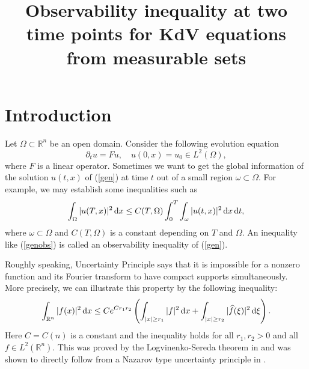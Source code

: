 \documentclass[12pt]{amsart}
\title[Observability inequality ]
{ \bf
 Observability inequality at two time points for KdV equations from measurable sets}
\author[ ]
{    }
\def\R {\mathbb{R}}
\def\d{{\,\rm d}}
\theoremstyle{definition}
\numberwithin{equation}{section}
\begin{document}



\maketitle
\tableofcontents
\section{Introduction}
Let $\Omega \subset \R^{n}$ be an open domain.
Consider the following evolution equation 
\begin{equation}
    \partial_t u=Fu,\quad u(0,x)=u_0\in L^2(\Omega),\label{gen}
\end{equation}
where $F$ is a linear operator.
Sometimes we want to get the global information of the solution $u(t,x)$ of (\ref{gen}) at time $t$ out of a small region $\omega\subset \Omega$. For example, we may establish some inequalities such as 
\begin{equation}
    \int_{\Omega}|u(T,x)|^2\d x\le C(T,\Omega)\int_0^T\int_\omega |u(t,x)|^2\d x\d t,\label{genobs}
\end{equation}  
where $\omega\subset \Omega$ and $C(T,\Omega)$ is a constant depending on $T$ and $\Omega$.
An inequality like (\ref{genobs}) is called an observability inequality of (\ref{gen}).


Roughly speaking, Uncertainty Principle says that it is impossible for a nonzero function and its Fourier transform to have compact supports simultaneously. More precisely, we can illustrate this property by the following inequality:
\begin{equation}
    \int_{\R^n}|f(x)|^2\d x\le Ce^{Cr_1r_2}\left(\int_{|x|\ge r_1}|f|^2\d x+\int_{|x|\ge r_2}|\widehat{f}(\xi)|^2\d\xi\right).\label{un}
\end{equation}   
Here $C=C(n)$ is a constant and the inequality holds for all $r_1,r_2>0$ and all $f\in L^2(\R^n)$. This was proved by the Logvinenko-Sereda theorem in \cite{Log,Korv,Rouss,WWZZ} and was shown to directly follow from a Nazarov type uncertainty principle in \cite{Naza}.
\end{document}

